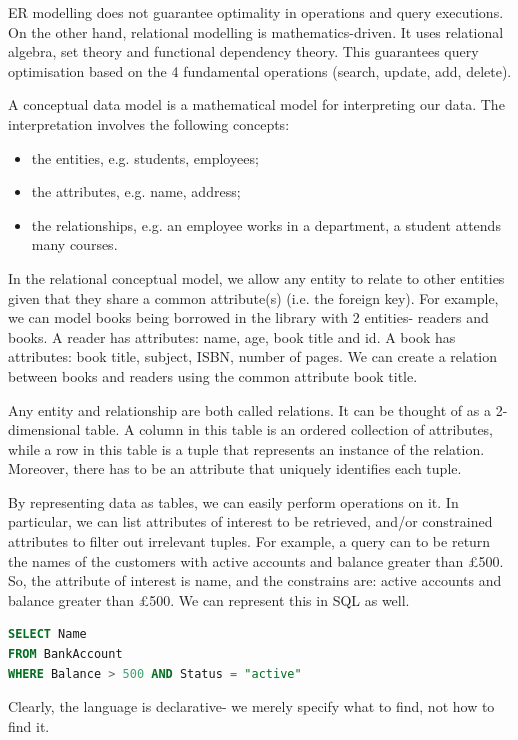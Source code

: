 \documentclass[a4paper, openany]{memoir}
\begin{document}
ER modelling does not guarantee optimality in operations and query executions. On the other hand, relational modelling is mathematics-driven. It uses relational algebra, set theory and functional dependency theory. This guarantees query optimisation based on the 4 fundamental operations (search, update, add, delete).

A conceptual data model is a mathematical model for interpreting our data. The interpretation involves the following concepts:
\begin{itemize}
    \item the entities, e.g. students, employees;
    \item the attributes, e.g. name, address;
    \item the relationships, e.g. an employee works in a department, a student attends many courses.
\end{itemize}

In the relational conceptual model, we allow any entity to relate to other entities given that they share a common attribute(s) (i.e. the foreign key). For example, we can model books being borrowed in the library with 2 entities- readers and books. A reader has attributes: name, age, book title and id. A book has attributes: book title, subject, ISBN, number of pages. We can create a relation between books and readers using the common attribute book title.

Any entity and relationship are both called relations. It can be thought of as a 2-dimensional table. A column in this table is an ordered collection of attributes, while a row in this table is a tuple that represents an instance of the relation. Moreover, there has to be an attribute that uniquely identifies each tuple.

By representing data as tables, we can easily perform operations on it. In particular, we can list attributes of interest to be retrieved, and/or constrained attributes to filter out irrelevant tuples. For example, a query can to be return the names of the customers with active accounts and balance greater than £500. So, the attribute of interest is name, and the constrains are: active accounts and balance greater than £500. We can represent this in SQL as well.
\begin{lstlisting}[language=SQL]
SELECT Name 
FROM BankAccount 
WHERE Balance > 500 AND Status = "active"
\end{lstlisting}
Clearly, the language is declarative- we merely specify what to find, not how to find it.
\end{document}
